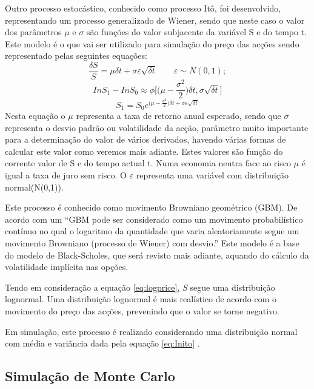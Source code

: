 \documentclass[
  12pt,
  a4paper,
  openany]{book}
\begin{document}
Outro processo estocástico, conhecido como processo Itô, foi desenvolvido, representando um processo generalizado de Wiener, sendo que neste caso o valor dos parâmetros \(\mu\) e \(\sigma\) são funções do valor subjacente da variável S e do tempo t. Este modelo é o que vai ser utilizado para simulação do preço das acções sendo representado pelas seguintes equações:
\begin{equation} 
  \frac{\delta S}{S} = \mu\delta t +\sigma\varepsilon\sqrt{\delta t}\qquad\varepsilon \sim N(0,1);
  \label{eq:ito}
\end{equation}
\begin{equation} 
  In S_1 - InS_0 \approx\phi\Big[\Big(\mu-\frac{\sigma^2}{2}\Big)\delta t, \sigma\sqrt{\delta t}\Big]
  \label{eq:Inito}
\end{equation}
\begin{equation} 
  S_1 =S_0 e^{\Big(\mu-\frac{\sigma^2}{2}\Big)\delta t + \sigma\varepsilon\sqrt{\delta t}}
  \label{eq:logprice}
\end{equation}
Nesta equação o \(\mu\) representa a taxa de retorno anual esperado, sendo que \(\sigma\) representa o desvio padrão ou volatilidade da acção, parâmetro muito importante para a determinação do valor de vários derivados, havendo várias formas de calcular este valor como veremos mais adiante. Estes valores são função do corrente valor de S e do tempo actual t. Numa economia neutra face ao risco \(\mu\) é igual a taxa de juro sem risco. O \(\varepsilon\) representa uma variável com distribuição normal(N(0,1)).

Este processo é conhecido como movimento Browniano geométrico (GBM). De acordo com \citet{AppliedFinancial} um ``GBM pode ser considerado como um movimento probabilístico contínuo no qual o logaritmo da quantidade que varia aleatoriamente segue um movimento Browniano (processo de Wiener) com desvio.'' Este modelo é a base do modelo de Black-Scholes, que será revisto mais adiante, aquando do cálculo da volatilidade implícita nas opções.

Tendo em consideração a equação \eqref{eq:logprice}, \emph{S} segue uma distribuição lognormal. Uma distribuição lognormal é mais realístico de acordo com o movimento do preço das acções, prevenindo que o valor se torne negativo.

Em simulação, este processo é realizado considerando uma distribuição normal com média e variância dada pela equação \eqref{eq:Inito} \citep{FRM1}.

\hypertarget{simulauxe7uxe3o-de-monte-carlo}{%
\subsection{Simulação de Monte Carlo}\label{simulauxe7uxe3o-de-monte-carlo}}
\end{document}

